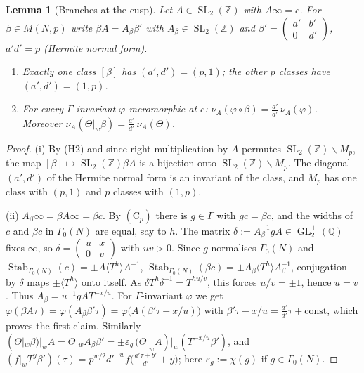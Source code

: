 \documentclass[11pt,a4paper]{article}
\newtheorem{lemma}[theorem]{Lemma}
\theoremstyle{definition}\newtheorem{definition}[theorem]{Definition}
\theoremstyle{remark}\newtheorem{remark}[theorem]{Remark}
\newcommand{\Z}{\mathbb Z}
\newcommand{\Q}{\mathbb Q}
\DeclareMathOperator{\SL}{SL}
\DeclareMathOperator{\GL}{GL}
\newcommand{\bmat}[4]{\left(\begin{smallmatrix}#1&#2\\#3&#4\end{smallmatrix}\right)}
\numberwithin{equation}{section}
\begin{document}
\begin{lemma}[Branches at the cusp]\label{B:lem:branch}
Let $A\in\SL_2(\Z)$ with $A\infty=c$. For $\beta\in M(N,p)$ write $\beta A=A_\beta\beta'$ with
$A_\beta\in\SL_2(\Z)$ and $\beta'=\bmat{a'}{b'}0{d'}$, $a'd'=p$ (Hermite normal form).
\begin{enumerate}[label=\textup{(\roman*)}]
\item Exactly one class $[\beta]$ has $(a',d')=(p,1)$; the other $p$ classes have $(a',d')=(1,p)$.
\item For every $\Gamma$-invariant $\varphi$ meromorphic at $c$:
$\nu_A(\varphi\circ\beta)=\frac{a'}{d'}\,\nu_A(\varphi)$. Moreover
$\nu_A(\Theta|_w\beta)=\frac{a'}{d'}\,\nu_A(\Theta)$.
\end{enumerate}
\end{lemma}
\begin{proof}
(i) By (H2) and since right multiplication by $A$ permutes $\SL_2(\Z)\backslash M_p$, the map
$[\beta]\mapsto\SL_2(\Z)\beta A$ is a bijection onto $\SL_2(\Z)\backslash M_p$. The diagonal
$(a',d')$ of the Hermite normal form is an invariant of the class, and $M_p$ has one class with
$(p,1)$ and $p$ classes with $(1,p)$.

(ii) $A_\beta\infty=\beta A\infty=\beta c$. By $(\mathrm C_p)$ there is $g\in\Gamma$ with $gc=\beta c$,
and the widths of $c$ and $\beta c$ in $\Gamma_0(N)$ are equal, say to $h$. The matrix
$\delta:=A_\beta^{-1}gA\in\GL_2^+(\Q)$ fixes $\infty$, so $\delta=\bmat ux0v$ with $uv>0$. Since $g$
normalises $\Gamma_0(N)$ and $\operatorname{Stab}_{\Gamma_0(N)}(c)=\pm A\langle T^h\rangle A^{-1}$,
$\operatorname{Stab}_{\Gamma_0(N)}(\beta c)=\pm A_\beta\langle T^h\rangle A_\beta^{-1}$, conjugation
by $\delta$ maps $\pm\langle T^h\rangle$ onto itself. As $\delta T^h\delta^{-1}=T^{hu/v}$, this
forces $u/v=\pm1$, hence $u=v$. Thus $A_\beta=u^{-1}gAT^{-x/u}$. For $\Gamma$-invariant $\varphi$ we get
$\varphi(\beta A\tau)=\varphi(A_\beta\beta'\tau)=\varphi\bigl(A(\beta'\tau-x/u)\bigr)$ with
$\beta'\tau-x/u=\frac{a'}{d'}\tau+\mathrm{const}$, which proves the first claim. Similarly
$(\Theta|_w\beta)|_wA=\Theta|_wA_\beta\beta'=\pm\varepsilon_g\,(\Theta|_wA)|_w(T^{-x/u}\beta')$, and
$(f|_w T^{y}\beta')(\tau)=p^{w/2}d'^{-w}f\bigl(\frac{a'\tau+b'}{d'}+y\bigr)$; here
$\varepsilon_g:=\chi(g)$ if $g\in\Gamma_0(N)$.
\end{proof}
\end{document}
